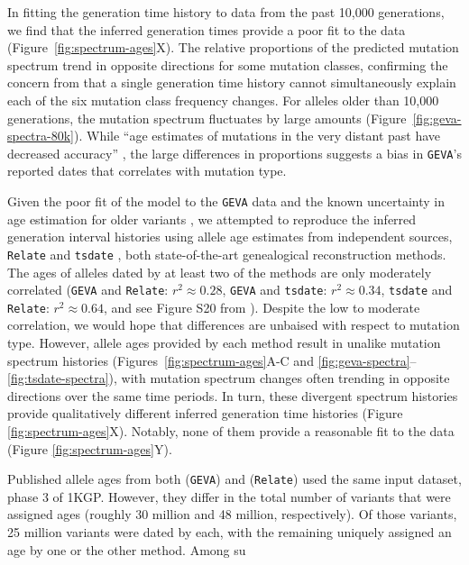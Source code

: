 \documentclass[]{article}
\newcommand{\GEVA}{\texttt{GEVA}\xspace}
\newcommand{\tsdate}{\texttt{tsdate}\xspace}
\newcommand{\relate}{\texttt{Relate}\xspace}
\begin{document}
In fitting the generation time history to data from the past 10,000
generations, we find that the inferred generation times provide a poor fit to
the data (Figure~\ref{fig:spectrum-ages}X). The relative proportions of the
predicted mutation spectrum trend in opposite directions for some mutation
classes, confirming the concern from \citet{gao2022limited} that a single
generation time history cannot simultaneously explain each of the six mutation
class frequency changes. For alleles older than 10,000 generations, the
mutation spectrum fluctuates by large amounts
(Figure~\ref{fig:geva-spectra-80k}). While ``age estimates of mutations in the
very distant past have decreased accuracy''
\citep{albers2020dating,wang2023human}, the large differences in proportions
suggests a bias in \GEVA's reported dates that correlates with mutation type.

Given the poor fit of the model to the \GEVA data and the known uncertainty in
age estimation for older variants \citep{albers2020dating}, we attempted to
reproduce the inferred generation interval histories using allele age estimates
from independent sources, \relate \citep{speidel2019method} and \tsdate
\citep{wohns2022unified}, both state-of-the-art genealogical reconstruction
methods. The ages of alleles dated by at least two of the methods are only
moderately correlated (\GEVA and \relate: $r^2 \approx 0.28$, \GEVA and
\tsdate: $r^2 \approx 0.34$, \tsdate and \relate: $r^2 \approx 0.64$, and see
Figure S20 from \citet{wohns2022unified}). Despite the low to moderate
correlation, we would hope that differences are unbaised with respect to
mutation type. However, allele ages provided by each method result in unalike
mutation spectrum histories (Figures~\ref{fig:spectrum-ages}A-C and
\ref{fig:geva-spectra}--\ref{fig:tsdate-spectra}), with mutation spectrum
changes often trending in opposite directions over the same time periods. In
turn, these divergent spectrum histories provide qualitatively different
inferred generation time histories (Figure \ref{fig:spectrum-ages}X). Notably,
none of them provide a reasonable fit to the data (Figure
\ref{fig:spectrum-ages}Y).

Published allele ages from both \citet{albers2020dating} (\GEVA) and
\citet{speidel2019method} (\relate) used the same input dataset, phase 3 of
1KGP. However, they differ in the total number of variants that were assigned
ages (roughly 30 million and 48 million, respectively). Of those variants,
25 million variants were dated by each, with the remaining uniquely assigned
an age by one or the other method. Among su
\end{document}
